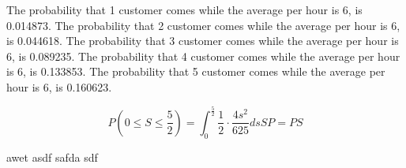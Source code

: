 \documentclass[12pt]{article}
\begin{document}
    The probability that 1 customer comes while the average per hour is 6, is 0.014873.
    The probability that 2 customer comes while the average per hour is 6, is 0.044618.
    The probability that 3 customer comes while the average per hour is 6, is 0.089235.
    The probability that 4 customer comes while the average per hour is 6, is 0.133853.
    The probability that 5 customer comes while the average per hour is 6, is 0.160623.

    \[
        P(0 \leq S \leq \frac{5}{2}) = \int_{0}^{\frac{5}{2}} \frac{1}{2} \cdot \frac{{4s^2}}{625} ds
        
        SP = PS
    \]
    \begin{itemize}
        awet
        asdf
        safda
        sdf
    \end{itemize}
\end{document}
